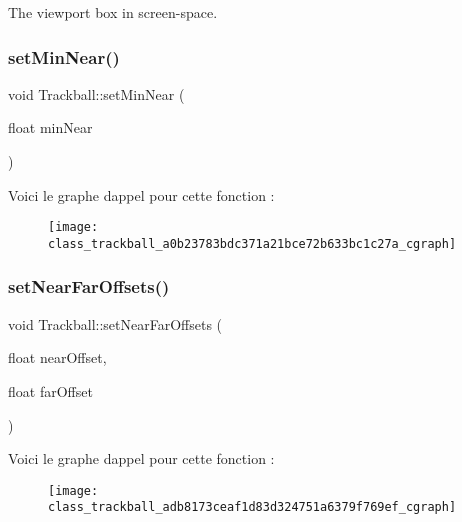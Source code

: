 The viewport box in screen-\/space. 

\mbox{\label{class_trackball_a0b23783bdc371a21bce72b633bc1c27a}} 
\subsubsection{\texorpdfstring{set\+Min\+Near()}{setMinNear()}}
{\footnotesize\ttfamily void Trackball\+::set\+Min\+Near (\begin{DoxyParamCaption}\item[{float}]{min\+Near }\end{DoxyParamCaption})}

Voici le graphe d\textquotesingle{}appel pour cette fonction \+:\nopagebreak
\begin{figure}[H]
\begin{center}
\leavevmode
\texttt{[image: class\_trackball\_a0b23783bdc371a21bce72b633bc1c27a\_cgraph]}
\end{center}
\end{figure}
\mbox{\label{class_trackball_adb8173ceaf1d83d324751a6379f769ef}} 
\subsubsection{\texorpdfstring{set\+Near\+Far\+Offsets()}{setNearFarOffsets()}}
{\footnotesize\ttfamily void Trackball\+::set\+Near\+Far\+Offsets (\begin{DoxyParamCaption}\item[{float}]{near\+Offset,  }\item[{float}]{far\+Offset }\end{DoxyParamCaption})}

Voici le graphe d\textquotesingle{}appel pour cette fonction \+:\nopagebreak
\begin{figure}[H]
\begin{center}
\leavevmode
\texttt{[image: class\_trackball\_adb8173ceaf1d83d324751a6379f769ef\_cgraph]}
\end{center}
\end{figure}
\mbox{\label{class_trackball_a279072f30b8e41189b05ce0a1caf36a0}} 
